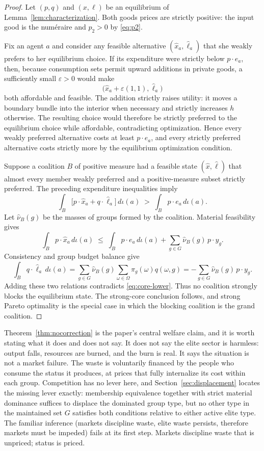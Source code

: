 \documentclass[12pt,letterpaper]{article}
\theoremstyle{definition}
\begin{document}
\begin{proof}
Let $(p,q)$ and $(x,\ell)$ be an equilibrium of Lemma~\ref{lem:characterization}.
Both goods prices are strictly positive: the input good is the num\'{e}raire and $p_2>0$ by \eqref{eq:p2}.

Fix an agent $a$ and consider any feasible alternative $(\hat x_a,\hat\ell_a)$ that she weakly prefers to her equilibrium choice.
If its expenditure were strictly below $p\cdot e_a$, then, because consumption sets permit upward additions in private goods, a sufficiently small $\varepsilon>0$ would make
\[
  \big(\hat x_a+\varepsilon(1,1),\hat\ell_a\big)
\]
both affordable and feasible.
The addition strictly raises utility: it moves a boundary bundle into the interior when necessary and strictly increases $h$ otherwise.
The resulting choice would therefore be strictly preferred to the equilibrium choice while affordable, contradicting optimization.
Hence every weakly preferred alternative costs at least $p\cdot e_a$, and every strictly preferred alternative costs strictly more by the equilibrium optimization condition.

Suppose a coalition $B$ of positive measure had a feasible state $(\hat x,\hat\ell)$ that almost every member weakly preferred and a positive-measure subset strictly preferred.
The preceding expenditure inequalities imply
\begin{equation}\label{eq:core-lower}
  \int_B \big[p\cdot\hat x_a+q\cdot\hat\ell_a\big]\,d\iota(a)
  \;>\;
  \int_B p\cdot e_a\,d\iota(a).
\end{equation}
Let $\hat\nu_B(g)$ be the masses of groups formed by the coalition.
Material feasibility gives
\[
  \int_B p\cdot\hat x_a\,d\iota(a)
  \;\leq\;
  \int_B p\cdot e_a\,d\iota(a)
  +\sum_{g\in G}\hat\nu_B(g)\,p\cdot y_g.
\]
Consistency and group budget balance give
\[
  \int_B q\cdot\hat\ell_a\,d\iota(a)
  =
  \sum_{g\in G}\hat\nu_B(g)
  \sum_{\omega\in\Omega}\pi_g(\omega)q(\omega,g)
  =
  -\sum_{g\in G}\hat\nu_B(g)\,p\cdot y_g.
\]
Adding these two relations contradicts \eqref{eq:core-lower}.
Thus no coalition strongly blocks the equilibrium state.
The strong-core conclusion follows, and strong Pareto optimality is the special case in which the blocking coalition is the grand coalition.
\end{proof}

Theorem~\ref{thm:nocorrection} is the paper's central welfare claim, and it is worth stating what it does and does not say.
It does not say the elite sector is harmless: output falls, resources are burned, and the burn is real.
It says the situation is not a market failure.
The waste is voluntarily financed by the people who consume the status it produces, at prices that fully internalize its cost within each group.
Competition has no lever here, and Section~\ref{sec:displacement} locates the missing lever exactly: membership equivalence together with strict material dominance suffices to displace the dominated group type, but no other type in the maintained set $G$ satisfies both conditions relative to either active elite type.
The familiar inference (markets discipline waste, elite waste persists, therefore markets must be impeded) fails at its first step.
Markets discipline waste that is unpriced; status is priced.
\end{document}
